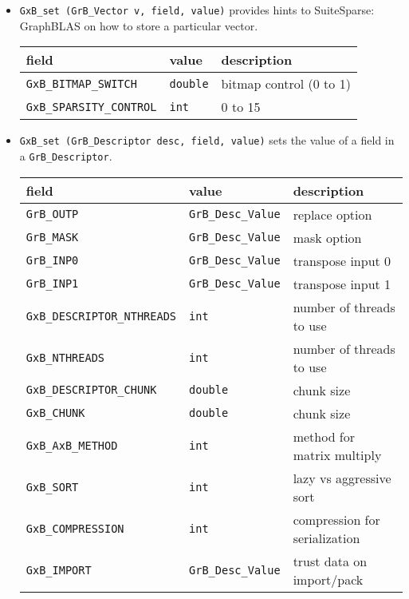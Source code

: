 \documentclass[12pt]{article}
\begin{document}
\begin{itemize}
\item \verb'GxB_set (GrB_Vector v, field, value)' provides hints to
    SuiteSparse: GraphBLAS on how to store a particular vector.

{\footnotesize
\begin{tabular}{lll}
field                       & value         & description \\
\hline
\verb'GxB_BITMAP_SWITCH'    & \verb'double' & bitmap control (0 to 1) \\
\verb'GxB_SPARSITY_CONTROL' & \verb'int'    & 0 to 15 \\
\hline
\end{tabular}
}

\item \verb'GxB_set (GrB_Descriptor desc, field, value)' sets
    the value of a field in a \verb'GrB_Descriptor'.

{\footnotesize
\begin{tabular}{lll}
field                       & value         & description \\
\hline
\verb'GrB_OUTP'     & \verb'GrB_Desc_Value' & replace option \\
\verb'GrB_MASK'     & \verb'GrB_Desc_Value' & mask option \\
\verb'GrB_INP0'     & \verb'GrB_Desc_Value' & transpose input 0 \\
\verb'GrB_INP1'     & \verb'GrB_Desc_Value' & transpose input 1 \\
\verb'GxB_DESCRIPTOR_NTHREADS'  & \verb'int' & number of threads to use \\
\verb'GxB_NTHREADS'             & \verb'int' & number of threads to use \\
\verb'GxB_DESCRIPTOR_CHUNK'     & \verb'double' & chunk size \\
\verb'GxB_CHUNK'                & \verb'double' & chunk size \\
\verb'GxB_AxB_METHOD'           & \verb'int' & method for matrix multiply \\
\verb'GxB_SORT'                 & \verb'int' & lazy vs aggressive sort \\
\verb'GxB_COMPRESSION'          & \verb'int' & compression for serialization \\
\verb'GxB_IMPORT'    & \verb'GrB_Desc_Value' & trust data on import/pack \\
\hline
\end{tabular}
}

\end{itemize}
\end{document}
